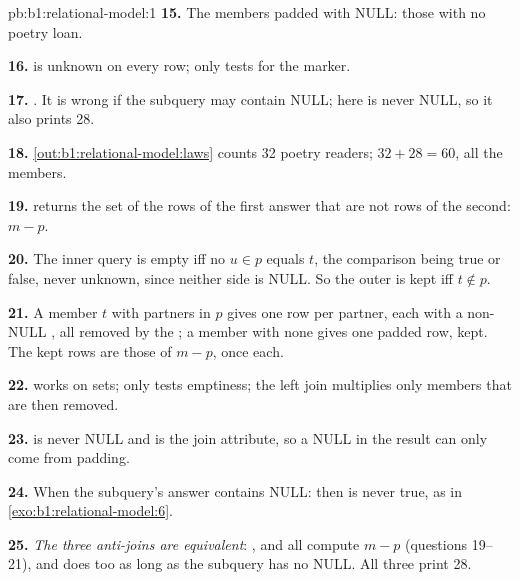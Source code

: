 \begin{solution}{pb:b1:relational-model:1}
\textbf{15.} The members padded with NULL: those with no poetry loan.

\textbf{16.}  is unknown on every row; only  tests for the marker.

\textbf{17.} . It is wrong if the subquery may contain
NULL; here  is never NULL, so it also prints 28.

\textbf{18.} \cref{out:b1:relational-model:laws} counts 32 poetry readers; $32 + 28 = 60$, all the members.

\textbf{19.}  returns the set of the rows of the first answer that are not rows of the second: $m - p$.

\textbf{20.} The inner query is empty iff no $u \in p$ equals $t$, the comparison being true or false, never unknown,
since neither side is NULL. So the outer  is kept iff $t \notin p$.

\textbf{21.} A member $t$ with partners in $p$ gives one row per partner, each with a non-NULL , all
removed by the ; a member with none gives one padded row, kept. The kept rows are those of $m - p$, once each.

\textbf{22.}  works on sets;  only tests emptiness; the left join multiplies only members
that are then removed.

\textbf{23.}  is never NULL and is the join attribute, so a NULL in the result can only come from
padding.

\textbf{24.} When the subquery's answer contains NULL: then  is never true, as in
\cref{exo:b1:relational-model:6}.

\textbf{25.} \emph{The three anti-joins are equivalent}: ,  and 
all compute $m - p$ (questions 19--21), and  does too as long as the subquery has no NULL. All three print 28.
\end{solution}
